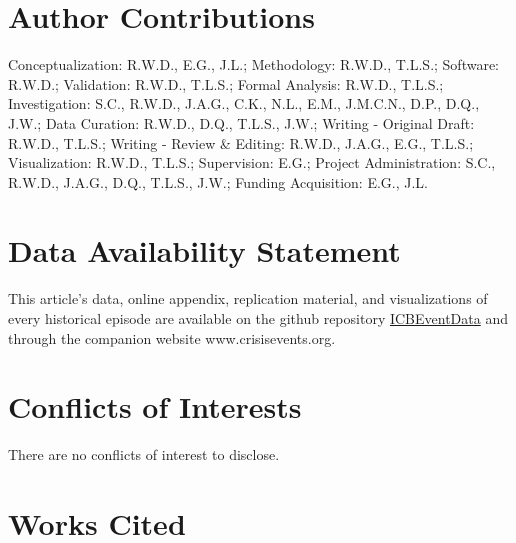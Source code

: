 \documentclass{article}
\begin{document}
\hypertarget{author-contributions}{%
\section{Author Contributions}\label{author-contributions}}

Conceptualization: R.W.D., E.G., J.L.; Methodology: R.W.D., T.L.S.;
Software: R.W.D.; Validation: R.W.D., T.L.S.; Formal Analysis: R.W.D.,
T.L.S.; Investigation: S.C., R.W.D., J.A.G., C.K., N.L., E.M., J.M.C.N.,
D.P., D.Q., J.W.; Data Curation: R.W.D., D.Q., T.L.S., J.W.; Writing -
Original Draft: R.W.D., T.L.S.; Writing - Review \& Editing: R.W.D.,
J.A.G., E.G., T.L.S.; Visualization: R.W.D., T.L.S.; Supervision: E.G.;
Project Administration: S.C., R.W.D., J.A.G., D.Q., T.L.S., J.W.;
Funding Acquisition: E.G., J.L.

\hypertarget{data-availability-statement}{%
\section{Data Availability
Statement}\label{data-availability-statement}}

This article's data, online appendix, replication material, and
visualizations of every historical episode are available on the github
repository
\href{https://urldefense.com/v3/__https://github.com/CenterForPeaceAndSecurityStudies/ICBEventData__;!!Mih3wA!WxDJtEczKfxGTh0S2Krunap8ReymFEL5iTWaSfOHeqlSdyfRx77zmjBSWO1OAm13$}{ICBEventData}
and through the companion website www.crisisevents.org.

\hypertarget{conflicts-of-interests}{%
\section{Conflicts of Interests}\label{conflicts-of-interests}}

There are no conflicts of interest to disclose.

\clearpage

\hypertarget{works-cited}{%
\section*{Works Cited}\label{works-cited}}
\end{document}
